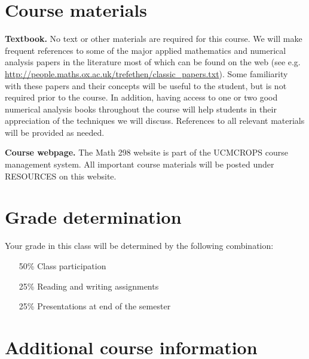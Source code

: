 \documentclass{article}
\begin{document}
\section*{Course materials}

\begin{description}

\item {\bf Textbook.} No text or other materials are required for this course.  We will make frequent references to some of the major applied mathematics and numerical analysis papers in the literature most of which can be found on the web (see e.g. \url{http://people.maths.ox.ac.uk/trefethen/classic_papers.txt}).  Some familiarity with these papers and their concepts will be useful to the student, but is not required prior to the course.  In addition, having access to one or two good numerical analysis books throughout the course will help students in their appreciation of the techniques we will discuss.  References to all relevant materials will be provided as needed.

\item {\bf Course webpage.} The Math 298 website is part of the
  UCMCROPS course management system. All important course materials
  will be posted under RESOURCES on this website.

\end{description}

\section*{Grade determination} 

\begin{description}

\item Your grade in this class will be determined by the following combination:

\begin{itemize}
\item[50\%]  Class participation
\item[25\%]  Reading and writing assignments
\item[25\%]  Presentations at end of the semester
\end{itemize}

\end{description}

\section*{Additional course information}
\end{document}
